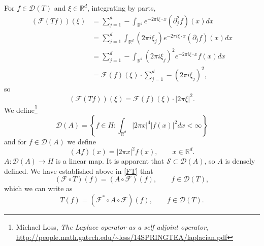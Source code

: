 \documentclass{article}
\theoremstyle{definition}
\begin{document}
For $f \in \mathscr{D}(T)$ and $\xi \in \mathbb{R}^d$, integrating by parts,
\begin{align*}
(\mathscr{F} (Tf))(\xi) &=\sum_{j=1}^d -\int_{\mathbb{R}^d} e^{-2\pi i\xi\cdot x} (\partial_j^2 f)(x) dx\\
&=\sum_{j=1}^d \int_{\mathbb{R}^d} (2\pi i\xi_j) e^{-2\pi i\xi\cdot x} (\partial_j f)(x) dx\\
&=\sum_{j=1}^d -\int_{\mathbb{R}^d} (2\pi i\xi_j)^2 e^{-2\pi i\xi\cdot x} f(x) dx\\
&=\mathscr{F}(f)(\xi) \cdot \sum_{j=1}^d -(2\pi i \xi_j)^2,
\end{align*}
so
\begin{equation}
(\mathscr{F} (Tf))(\xi)=\mathscr{F}(f)(\xi) \cdot |2\pi \xi|^2.
\label{FT}
\end{equation}
We define\footnote{Michael Loss, {\em The Laplace operator as a self adjoint operator}, \url{http://people.math.gatech.edu/~loss/14SPRINGTEA/laplacian.pdf}}
\[
\mathscr{D}(A) = \left\{f \in H: \int_{\mathbb{R}^d} |2\pi x|^4 |f(x)|^2 dx < \infty\right\}
\]
and for $f \in \mathscr{D}(A)$ we define
\[
(Af)(x) = |2\pi x|^2 f(x), \qquad x \in \mathbb{R}^d.
\]
$A:\mathscr{D}(A) \to H$ is a linear map. It is apparent that
$\mathscr{S} \subset \mathscr{D}(A)$, so $A$ is densely defined.
We have established above in \eqref{FT} that
\[
(\mathscr{F} \circ T)(f) = (A \circ \mathscr{F})(f), \qquad f \in \mathscr{D}(T),
\]
which we can write as
\begin{equation}
T(f) = (\mathscr{F}^* \circ A \circ \mathscr{F})(f),\qquad f \in \mathscr{D}(T).
\label{conjugate}
\end{equation}

 
\end{document}

